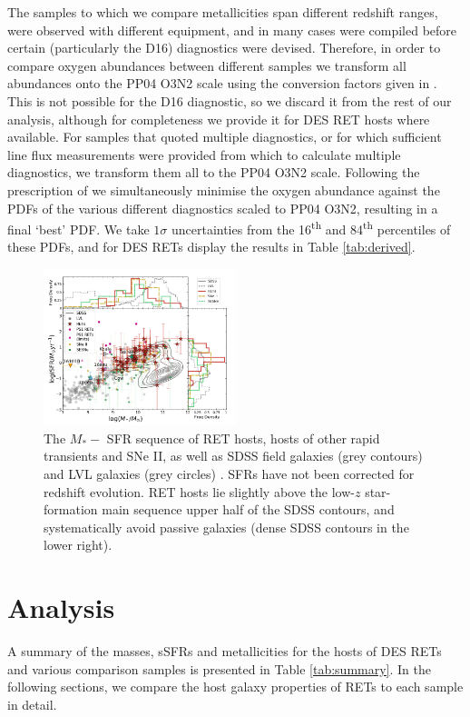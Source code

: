 \documentclass[fleqn,usenatbib,]{mnras}
\newcommand{\replyref}[1]{\color{magenta}#1 \color{black}}
\begin{document}
The samples to which we compare metallicities span different redshift ranges, were observed with different equipment, and in many cases were compiled before certain (particularly the D16) diagnostics were devised. Therefore, in order to compare oxygen abundances between different samples we transform all abundances onto the PP04 O3N2 scale using the conversion factors given in \citet{Kewley2008}. This is not possible for the D16 diagnostic, so we discard it from the rest of our analysis, although for completeness we provide it for DES RET hosts where available. For samples that quoted multiple diagnostics, or for which sufficient line flux measurements were provided from which to calculate multiple diagnostics, we transform them all to the PP04 O3N2 scale. Following the prescription of \citet{Kruehler2015} we simultaneously minimise the oxygen abundance against the PDFs of the various different diagnostics scaled to PP04 O3N2, resulting in a final `best' PDF. We take $1\sigma$ uncertainties from the 16\textsuperscript{th} and 84\textsuperscript{th} percentiles of these PDFs, and for DES RETs display the results in Table \ref{tab:derived}.
\begin{figure}

\includegraphics[width=0.5\textwidth]{figs/SFR_Mike_RETs.png}
\caption{The $M_* -$ SFR sequence of RET hosts, hosts of other rapid transients and SNe II, as well as SDSS field galaxies (grey contours) and \replyref{LVL galaxies (grey circles)}. SFRs have not been corrected for redshift evolution. RET hosts lie slightly above the low-$z$ star-formation main sequence upper half of the SDSS contours, and systematically avoid passive galaxies (dense SDSS contours in the lower right).
\label{fig:sfms_sfr}}
\end{figure}

\section{Analysis}
\label{sec:analysis} %
A summary of the masses, sSFRs and metallicities for the hosts of DES RETs and various comparison samples is presented in Table \ref{tab:summary}. In the following sections, we compare the host galaxy properties of RETs to each sample in detail.
\end{document}
